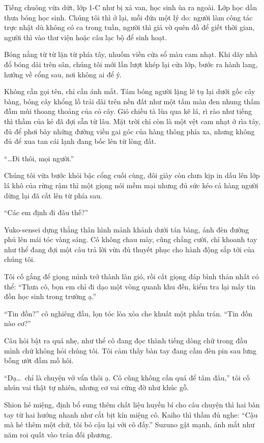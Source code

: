\documentclass[../main.tex]{subfiles}
\begin{document}
Tiếng chuông vừa dứt, lớp 1-C như bị xả van, học sinh ùa ra ngoài. Lớp học dần thưa bóng học sinh. Chúng tôi thì ở lại, mỗi đứa một lý do: người làm công tác trực nhật dù không có ca trong tuần, người thì giả vờ quên đồ để giết thời gian, người thì vào thư viện hoặc câu lạc bộ để sinh hoạt.

Bóng nắng từ từ lặn từ phía tây, nhuốm viền cửa sổ màu cam nhạt. Khi dãy nhà đổ bóng dài trên sân, chúng tôi mới lần lượt khép lại cửa lớp, bước ra hành lang, hướng về cổng sau, nơi không ai để ý.

Không cần gọi tên, chỉ cần ánh mắt. Tám bóng người lặng lẽ tụ lại dưới gốc cây bàng, bóng cây khổng lồ trải dài trên nền đất như một tấm màn đen nhung thấm đẫm mùi thoang thoảng của cỏ cây. Gió chiều tà lùa qua kẽ lá, rì rào như tiếng thì thầm của kẻ đã đợi sẵn từ lâu. Mặt trời chỉ còn là một vệt cam nhạt ở rìa tây, đủ để phơi bày những đường viền gai góc của hàng thông phía xa, nhưng không đủ để xua tan cái lạnh đang bốc lên từ lòng đất.

``\dots Đi thôi, mọi người.''

Chúng tôi vừa bước khỏi bậc cổng cuối cùng, đôi giày còn chưa kịp in dấu lên lớp lá khô của rừng rậm thì một giọng nói mềm mại nhưng đủ sức kéo cả hàng người dừng lại đã cất lên từ phía sau.

``Các em định đi đâu thế?''

Yuko-sensei dựng thẳng thân hình mảnh khảnh dưới tán bàng, ánh đèn đường phủ lên mái tóc vàng sáng. Cô không chau mày, cũng chẳng cười, chỉ khoanh tay như thể đang đợi một câu trả lời vừa đủ thuyết phục cho hành động sắp tới của chúng tôi.

Tôi cố gắng để giọng mình trở thành làn gió, rồi cất giọng đáp bình thản nhất có thể: ``Thưa cô, bọn em chỉ đi dạo một vòng quanh khu đền, kiểm tra lại mấy tin đồn học sinh trong trường ạ.''

``Tin đồn?'' cô nghiêng đầu, lọn tóc lòa xòa che khuất một phần trán. ``Tin đồn nào cơ?''

Câu hỏi bật ra quá nhẹ, như thể cô đang đọc thành tiếng dòng chữ trong đầu mình chứ không hỏi chúng tôi. Tôi cảm thấy bàn tay đang cầm đèn pin sau lưng bỗng ướt đẫm mồ hôi.

``Dạ\dots\ chỉ là chuyện vớ vẩn thôi ạ. Cô cũng không cần quá để tâm đâu,'' tôi cố nhún vai thật tự nhiên, nhưng cơ vai cứng đờ như khúc gỗ.

Shion hé miệng, định bổ sung thêm chất liệu huyền bí cho câu chuyện thì hai bàn tay từ hai hướng nhanh như cắt bịt kín miệng cô. Kaiho thì thầm đủ nghe: ``Cậu mà hé thêm một chữ, tôi bỏ cậu lại với cô đấy.'' Suzuno gật mạnh, ánh mắt như năm roi quất vào trán đối phương.
\end{document}
